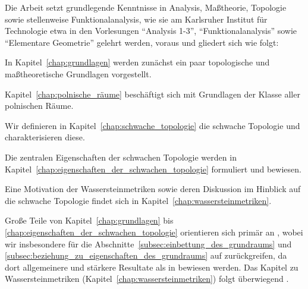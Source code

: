 \documentclass[../thesis/thesis.tex]{subfiles}
\begin{document}
	Die Arbeit setzt grundlegende Kenntnisse in Analysis, Maßtheorie, Topologie sowie stellenweise Funktionalanalysis, wie sie am Karlsruher 
	Institut für Technologie etwa in den Vorlesungen
	\enquote{Analysis 1-3}, \enquote{Funktionalanalysis} sowie \enquote{Elementare Geometrie} gelehrt werden, voraus und gliedert sich wie folgt:
	\begin{itemizethm}
		\item In Kapitel~\ref{chap:grundlagen} werden zunächst ein paar topologische und maßtheoretische Grundlagen vorgestellt.
		\item Kapitel~\ref{chap:polnische_räume} beschäftigt sich mit Grundlagen der Klasse aller polnischen Räume.
		\item Wir definieren in Kapitel~\ref{chap:schwache_topologie} die schwache Topologie und charakterisieren diese.
		\item Die zentralen Eigenschaften der schwachen Topologie werden in Kapitel~\ref{chap:eigenschaften_der_schwachen_topologie}
		formuliert und bewiesen.
		\item Eine Motivation der Wassersteinmetriken sowie deren Diskussion im Hinblick auf die schwache Topologie findet sich in Kapitel~\ref{chap:wassersteinmetriken}.
	\end{itemizethm}

	Große Teile von Kapitel~\ref{chap:grundlagen} bis \ref{chap:eigenschaften_der_schwachen_topologie} orientieren sich primär an \cite[Kapitel 4.14]{Simon.2015}, 
	wobei wir insbesondere für die Abschnitte~\ref{subsec:einbettung_des_grundraums} und \ref{subsec:beziehung_zu_eigenschaften_des_grundraums} auf \cite{Varadarajan.1958}
	zurückgreifen, da dort allgemeinere und stärkere Resultate als in \cite{Simon.2015} bewiesen werden. Das Kapitel zu Wassersteinmetriken (Kapitel~\ref{chap:wassersteinmetriken})
	folgt überwiegend \cite[Kapitel 4 bis 6]{Villani.2009}.
	
	
	
\end{document}
